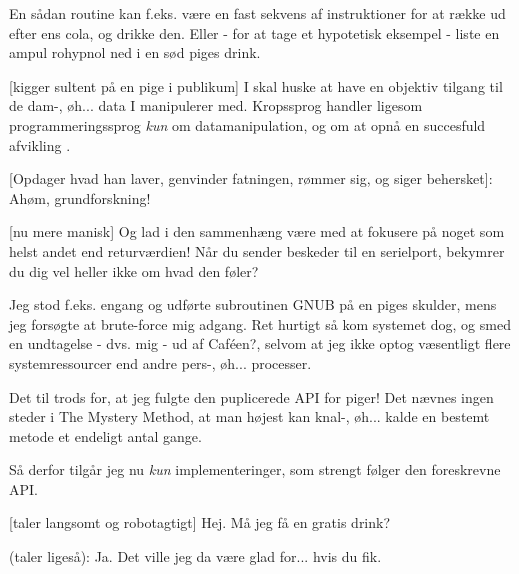 \documentclass[a4paper,11pt]{article}
\begin{document}
\begin{sketch}
 En sådan routine kan f.eks. være en fast sekvens af
instruktioner for at række ud efter ens cola, og drikke den. Eller -
for at tage et hypotetisk eksempel - liste en ampul rohypnol ned i en
sød piges drink. 

[kigger sultent på en pige i publikum] I skal huske at have en
objektiv tilgang til de dam-, øh... data I manipulerer med. Kropssprog
handler ligesom programmeringssprog \textit{kun} om datamanipulation,
og om at opnå en succesfuld afvikling .

[Opdager hvad han laver, genvinder fatningen, rømmer sig, og
  siger behersket]: Ahøm, grundforskning!

[nu mere manisk] Og lad i den sammenhæng være med at fokusere
på noget som helst andet end returværdien! Når du sender beskeder til
en serielport, bekymrer du dig vel heller ikke om hvad den føler?

 Jeg stod f.eks. engang og udførte subroutinen GNUB på en
piges skulder, mens jeg forsøgte at brute-force mig adgang. Ret
hurtigt så kom systemet dog, og smed en undtagelse - dvs. mig - ud af
Caféen?, selvom at jeg ikke optog væsentligt flere systemressourcer
end andre pers-, øh... processer.

 Det til trods for, at jeg fulgte den puplicerede API for
piger! Det nævnes ingen steder i The Mystery Method, at man højest kan
knal-, øh... kalde en bestemt metode et endeligt antal gange.

 Så derfor tilgår jeg nu \textit{kun} implementeringer, som
strengt følger den foreskrevne API.


[taler langsomt og robotagtigt] Hej. Må jeg få en gratis
drink?

 (taler ligeså): Ja. Det ville jeg da være glad for... hvis du
fik.


\end{sketch}
\end{document}
